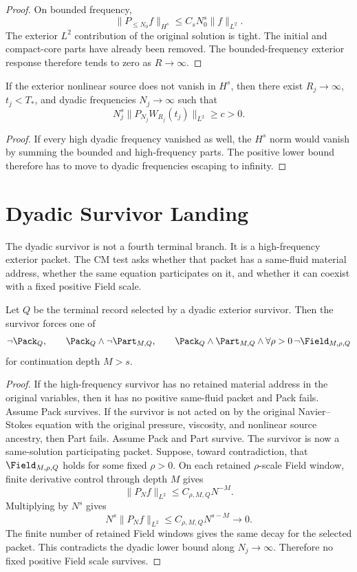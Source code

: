 \begin{proof}
On bounded frequency,
\[
  \|P_{\le N_0}f\|_{H^s}\le C_sN_0^s\|f\|_{L^2}.
\]
The exterior \(L^2\) contribution of the original solution is tight.
The initial and compact-core parts have already been removed.
The bounded-frequency exterior response therefore tends to zero as \(R\to\infty\).
\end{proof}

\begin{corollary}
If the exterior nonlinear source does not vanish in \(H^s\), then there exist \(R_j\to\infty\), \(t_j<T_*\), and dyadic frequencies \(N_j\to\infty\) such that
\[
  N_j^s\|P_{N_j}W_{R_j}(t_j)\|_{L^2}\ge c>0.
\]
\end{corollary}

\begin{proof}
If every high dyadic frequency vanished as well, the \(H^s\) norm would vanish by summing the bounded and high-frequency parts.
The positive lower bound therefore has to move to dyadic frequencies escaping to infinity.
\end{proof}

\section{Dyadic Survivor Landing}

The dyadic survivor is not a fourth terminal branch.
It is a high-frequency exterior packet.
The CM test asks whether that packet has a same-fluid material address, whether the same equation participates on it, and whether it can coexist with a fixed positive Field scale.

\begin{proposition}
Let \(Q\) be the terminal record selected by a dyadic exterior survivor.
Then the survivor forces one of
\[
  \neg\Pack_Q,\qquad
  \Pack_Q\wedge\neg\Part_{M,Q},\qquad
  \Pack_Q\wedge\Part_{M,Q}\wedge\forall\rho>0\,\neg\Field_{M,\rho,Q}
\]
for continuation depth \(M>s\).
\end{proposition}

\begin{proof}
If the high-frequency survivor has no retained material address in the original variables, then it has no positive same-fluid packet and Pack fails.
Assume Pack survives.
If the survivor is not acted on by the original Navier--Stokes equation with the original pressure, viscosity, and nonlinear source ancestry, then Part fails.
Assume Pack and Part survive.
The survivor is now a same-solution participating packet.
Suppose, toward contradiction, that \(\Field_{M,\rho,Q}\) holds for some fixed \(\rho>0\).
On each retained \(\rho\)-scale Field window, finite derivative control through depth \(M\) gives
\[
  \|P_N f\|_{L^2}\le C_{\rho,M,Q}N^{-M}.
\]
Multiplying by \(N^s\) gives
\[
  N^s\|P_N f\|_{L^2}\le C_{\rho,M,Q}N^{s-M}\to0.
\]
The finite number of retained Field windows gives the same decay for the selected packet.
This contradicts the dyadic lower bound along \(N_j\to\infty\).
Therefore no fixed positive Field scale survives.
\end{proof}

